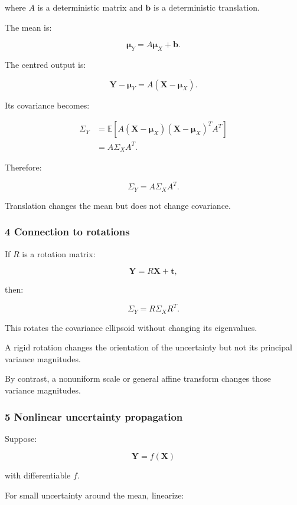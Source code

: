 where \(A\) is a deterministic matrix and \(\mathbf b\) is a deterministic translation.

The mean is:

\[
 \boxed{ \boldsymbol\mu_Y=A\boldsymbol\mu_X+\mathbf b }.
\]

The centred output is:

\[
 \mathbf Y-\boldsymbol\mu_Y = A(\mathbf X-\boldsymbol\mu_X).
\]

Its covariance becomes:

\[
 \begin{aligned} \Sigma_Y &= \mathbb E[ A(\mathbf X-\boldsymbol\mu_X) (\mathbf X-\boldsymbol\mu_X)^TA^T ]\\ &= A\Sigma_XA^T. \end{aligned}
\]

Therefore:

\[
 \boxed{ \Sigma_Y=A\Sigma_XA^T }.
\]

Translation changes the mean but does not change covariance.

\subsubsection{4 Connection to rotations}\label{02-foundations-ii-ch024-connection-to-rotations}

If \(R\) is a rotation matrix:

\[
 \mathbf Y=R\mathbf X+\mathbf t,
\]

then:

\[
 \boxed{ \Sigma_Y=R\Sigma_XR^T }.
\]

This rotates the covariance ellipsoid without changing its eigenvalues.

A rigid rotation changes the orientation of the uncertainty but not its principal variance magnitudes.

By contrast, a nonuniform scale or general affine transform changes those variance magnitudes.

\subsubsection{5 Nonlinear uncertainty propagation}\label{02-foundations-ii-ch024-nonlinear-uncertainty-propagation}

Suppose:

\[
 \mathbf Y=f(\mathbf X)
\]

with differentiable \(f\).

For small uncertainty around the mean, linearize:

